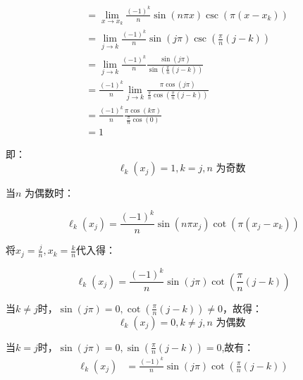 \documentclass[12pt,a4paper,UTF8]{ctexart}
\theoremstyle{nonumberplain}
\begin{document}
\begin{enumerate}
\begin{enumerate}
$$\begin{aligned}
                                                       & =\lim_{x \to x_{k}}\frac{(-1)^{k}}{n} \sin (n \pi x) \csc \left(\pi\left(x-x_{k}\right)\right)                      \\
                                                       & =\lim_{j \to k}  \frac{(-1)^{k}}{n} \sin (j \pi ) \csc \left(\frac{\pi}{n}\left(j-k\right)\right)                   \\
                                                       & =\lim_{j \to k}\frac{(-1)^{k}}{n} \frac{\sin (j \pi )}{ \sin \left(\frac{\pi}{n}\left(j-k\right)\right)}            \\
                                                       & =\frac{(-1)^{k}}{n}\lim_{j \to k}\frac{\pi \cos(j\pi)}{\frac{\pi}{n}\cos\left(\frac{\pi}{n}\left(j-k\right)\right)} \\
                                                       & =\frac{(-1)^{k}}{n}\frac{\pi \cos(k\pi)}{\frac{\pi}{n}\cos\left(0\right)}                                           \\
                                                       & =1
                        \end{aligned}
                    $$
                    \par 即：
                    $$\ell_{k}\left(x_{j}\right)=1,k = j,n \text { 为奇数 }$$
                    \par 当$n$ 为偶数时：
                    \par $$\ell_{k}\left(x_{j}\right)=\frac{(-1)^{k}}{n} \sin (n \pi x_{j}) \cot \left(\pi\left(x_{j}-x_{k}\right)\right)$$
                    \par 将$x_{j}=\frac{j}{n},x_{k}=\frac{k}{n}$代入得：
                    \par $$\ell_{k}\left(x_{j}\right)=\frac{(-1)^{k}}{n} \sin (j \pi ) \cot \left(\frac{\pi}{n}\left(j-k\right)\right)$$
                    \par 当$k \neq j$时，$\sin (j \pi )=0,\cot \left(\frac{\pi}{n}\left(j-k\right)\right)\neq 0$，故得：
                    $$\ell_{k}\left(x_{j}\right)=0,k \neq j, n \text { 为偶数 }$$
                    \par 当$k=j$时，$\sin (j \pi )=0,\sin \left(\frac{\pi}{n}\left(j-k\right)\right)= 0$,故有：
                    $$\begin{aligned}\ell_{k}\left(x_{j}\right) & =\frac{(-1)^{k}}{n} \sin (j \pi ) \cot \left(\frac{\pi}{n}\left(j-k\right)\right)                                                                                               \\

\end{aligned}$$
\end{enumerate}
\end{enumerate}
\end{document}
